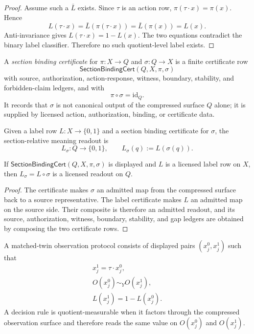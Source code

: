 \begin{proof}
Assume such a $\bar L$ exists. Since $\tau$ is an action row,
$\pi(\tau\cdot x)=\pi(x)$. Hence
$$
L(\tau\cdot x)=\bar L(\pi(\tau\cdot x))
=\bar L(\pi(x))=L(x).
$$
Anti-invariance gives $L(\tau\cdot x)=1-L(x)$. The two equations
contradict the binary label classifier. Therefore no such quotient-level
label exists.
\end{proof}

\begin{definition}
\label{def:section-binding-certificate}
A \emph{section binding certificate} for $\pi:X\to Q$ and
$\sigma:Q\to X$ is a finite certificate row
$$
\mathsf{SectionBindingCert}(Q,X,\pi,\sigma)
$$
with source, authorization, action-response, witness, boundary,
stability, and forbidden-claim ledgers, and with
$$
\pi\circ\sigma=\mathrm{id}_Q.
$$
It records that $\sigma$ is not canonical output of the compressed
surface $Q$ alone; it is supplied by licensed action, authorization,
binding, or certificate data.
\end{definition}

\begin{definition}
\label{def:section-relative-meaning}
Given a label row $L:X\to\{0,1\}$ and a section binding certificate for
$\sigma$, the section-relative meaning readout is
$$
L_\sigma:Q\to\{0,1\},
\qquad
L_\sigma(q):=L(\sigma(q)).
$$
\end{definition}

\begin{theorem}
\label{thm:sections-license-fiber-level-meaning}
If $\mathsf{SectionBindingCert}(Q,X,\pi,\sigma)$ is displayed and $L$ is
a licensed label row on $X$, then $L_\sigma=L\circ\sigma$ is a licensed
readout on $Q$.
\end{theorem}

\begin{proof}
The certificate makes $\sigma$ an admitted map from the compressed surface
back to a source representative. The label certificate makes $L$ an
admitted map on the source side. Their composite is therefore an admitted
readout, and its source, authorization, witness, boundary, stability, and
gap ledgers are obtained by composing the two certificate rows.
\end{proof}

\begin{definition}
\label{def:matched-twin-observation-protocol}
A matched-twin observation protocol consists of displayed pairs
$(x_j^0,x_j^1)$ such that
$$
\begin{gathered}
x_j^1=\tau\cdot x_j^0,\\
O(x_j^0)\sim_Y O(x_j^1),\\
L(x_j^1)=1-L(x_j^0).
\end{gathered}
$$
A decision rule is quotient-measurable when it factors through the
compressed observation surface and therefore reads the same value on
$O(x_j^0)$ and $O(x_j^1)$.
\end{definition}

